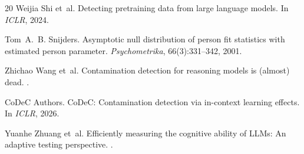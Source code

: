 \documentclass[11pt]{article}
\begin{document}
\begin{thebibliography}{20}
Weijia Shi et~al.
\newblock Detecting pretraining data from large language models.
\newblock In \emph{ICLR}, 2024.

Tom~A.~B. Snijders.
\newblock Asymptotic null distribution of person fit statistics with estimated person parameter.
\newblock \emph{Psychometrika}, 66(3):331--342, 2001.

Zhichao Wang et~al.
\newblock Contamination detection for reasoning models is (almost) dead.
.

{CoDeC Authors}.
\newblock CoDeC: Contamination detection via in-context learning effects.
\newblock In \emph{ICLR}, 2026.

Yuanhe Zhuang et~al.
\newblock Efficiently measuring the cognitive ability of LLMs: An adaptive testing perspective.
.

\end{thebibliography}
\end{document}
